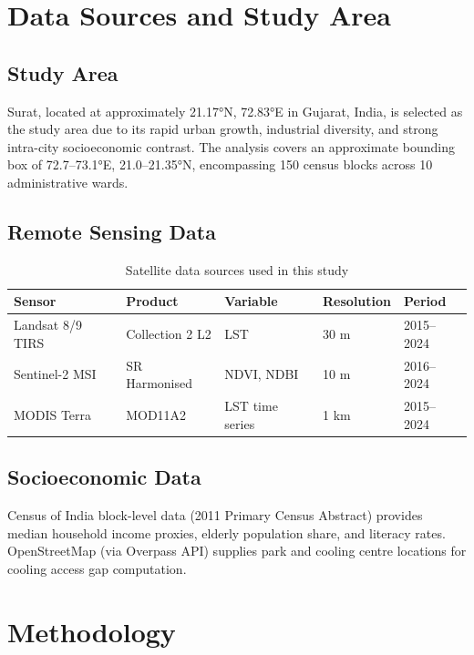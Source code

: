 \documentclass[12pt, a4paper]{article}
\begin{document}
\section{Data Sources and Study Area}

\subsection{Study Area}

Surat, located at approximately 21.17°N, 72.83°E in Gujarat, India, is selected
as the study area due to its rapid urban growth, industrial diversity, and strong
intra-city socioeconomic contrast. The analysis covers an approximate bounding
box of 72.7--73.1°E, 21.0--21.35°N, encompassing 150 census blocks across 10
administrative wards.

\subsection{Remote Sensing Data}

\begin{table}[H]
\centering
\caption{Satellite data sources used in this study}
\begin{tabular}{lllll}
\toprule
\textbf{Sensor} & \textbf{Product} & \textbf{Variable} & \textbf{Resolution} & \textbf{Period} \\
\midrule
Landsat 8/9 TIRS & Collection 2 L2 & LST & 30 m & 2015--2024 \\
Sentinel-2 MSI   & SR Harmonised   & NDVI, NDBI & 10 m & 2016--2024 \\
MODIS Terra      & MOD11A2         & LST time series & 1 km & 2015--2024 \\
\bottomrule
\end{tabular}
\end{table}

\subsection{Socioeconomic Data}

Census of India block-level data (2011 Primary Census Abstract) provides
median household income proxies, elderly population share, and literacy rates.
OpenStreetMap (via Overpass API) supplies park and cooling centre locations for
cooling access gap computation.

\section{Methodology}
\end{document}
